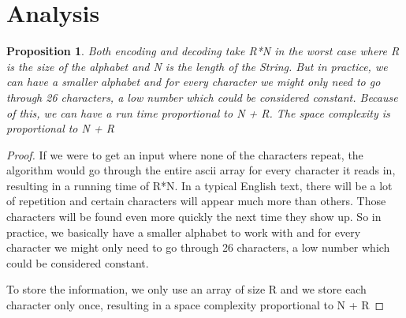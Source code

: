\documentclass[12pt]{article}
\newtheorem{proposition}[theorem]{Proposition}
\begin{document}
\section{Analysis}

\begin{proposition}
\label{numq}
Both encoding and decoding take R*N in the worst case where R is the size of the alphabet and N is the length of the String. But in practice, we can have a smaller alphabet and for every character we might only need to go through 26 characters, a low number which could be considered constant. Because of this, we can have a run time proportional to N + R.
The space complexity is proportional to N + R

\end{proposition}

\begin{proof}
If we were to get an input where none of the characters repeat, the algorithm would go through the entire ascii array for every character it reads in, resulting in a running time of R*N. In a typical English text, there will be a lot of repetition and certain characters will appear much more than others. Those characters will be found even more quickly the next time they show up. So in practice, we basically have a smaller alphabet to work with and for every character we might only need to go through 26 characters, a low number which could be considered constant.


To store the information, we only use an array of size R and we store each character only once, resulting in a space complexity proportional to N + R
\end{proof}


\end{document}
